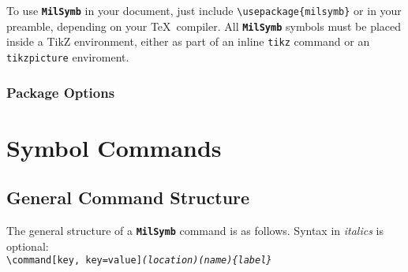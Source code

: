 \documentclass[a4paper, titlepage]{article}
\newcommand\MilSymb{\textbf{\texttt{MilSymb}} }
\begin{document}
To use \MilSymb in your document, just include \texttt{\textbackslash usepackage\{milsymb\}} or {} in your preamble, depending on your \TeX\  compiler. All \MilSymb symbols must be placed inside a TikZ environment, either as part of an inline \texttt{tikz} command or an \texttt{tikzpicture} enviroment. 

\subsubsection{Package Options}

\section{Symbol Commands}



\subsection{General Command Structure}

The general structure of a \MilSymb command is as follows. Syntax in \textit{italics} is optional:\\

\texttt{\textbackslash command[key, key=value]\textit{(location)(name)\{label\}}}
\end{document}
